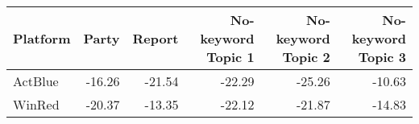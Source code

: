 \begin{tabular}{lrrrrr}
  \toprule
Platform & Party & Report & No-keyword Topic 1 & No-keyword Topic 2 & No-keyword Topic 3 \\ 
  \midrule
ActBlue & -16.26 & -21.54 & -22.29 & -25.26 & -10.63 \\ 
  WinRed & -20.37 & -13.35 & -22.12 & -21.87 & -14.83 \\ 
   \bottomrule
\end{tabular}
